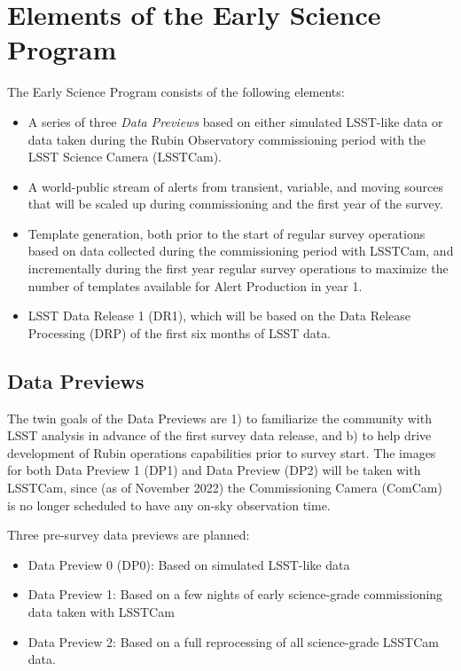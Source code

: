 \section{Elements of the Early Science Program}

The Early Science Program consists of the following elements:
\begin{itemize}
	\item A series of three \emph{Data Previews} based on either simulated LSST-like data or data taken during the Rubin Observatory commissioning period with the LSST Science Camera (LSSTCam).
	\item A world-public stream of alerts from transient, variable, and moving sources that will be scaled up during commissioning and the first year of the survey.
	\item Template generation, both prior to the start of regular survey operations based on data collected during the commissioning period with LSSTCam, and incrementally during the first year regular survey operations  to maximize the number of templates available for Alert Production in year 1.
	\item LSST Data Release 1 (DR1), which will be based on the Data Release Processing (DRP) of the first six months of LSST data.
\end{itemize}

\subsection{Data Previews}

The twin goals of the Data Previews are 1) to familiarize the community with LSST analysis in advance of the first survey data release, and b) to help drive development of Rubin operations capabilities prior to survey start.
The images for both Data Preview 1 (DP1) and Data Preview (DP2) will be taken with LSSTCam, since (as of November 2022) the Commissioning Camera (ComCam) is no longer scheduled to have any on-sky observation time.

Three pre-survey data previews are planned:
\begin{itemize}
\item  Data Preview 0 (DP0): Based on simulated LSST-like data
\item  Data Preview 1: Based on a few nights of early science-grade commissioning data taken with LSSTCam
\item Data Preview 2: Based on a full reprocessing of all science-grade LSSTCam data.

\end{itemize}

